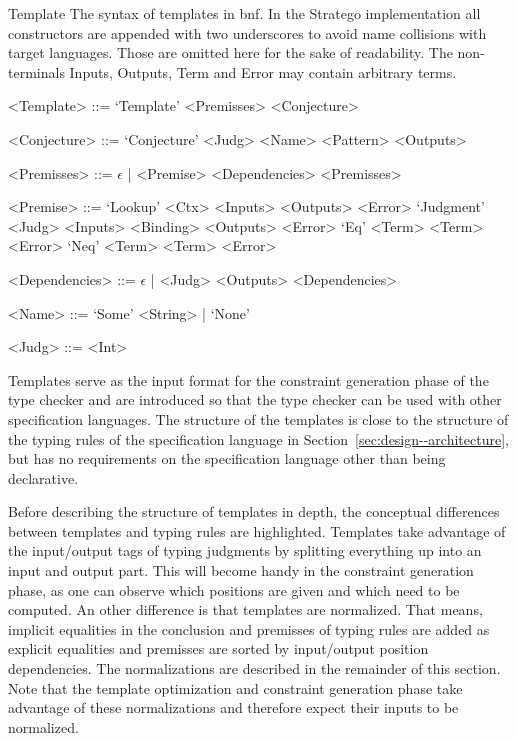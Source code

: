 \begin{definition}{Template}
  The syntax of templates in \gls{bnf}. In the Stratego implementation
  all constructors are appended with two underscores to avoid name
  collisions with target languages. Those are omitted here for the
  sake of readability. The non-terminals Inputs, Outputs, Term and
  Error may contain arbitrary terms.
  \begin{grammar}
    <Template> ::= `Template' <Premisses> <Conjecture>

    <Conjecture> ::= `Conjecture' <Judg> <Name> <Pattern> <Outputs>

    <Premisses> ::= $\epsilon$ | <Premise> <Dependencies> <Premisses>

    <Premise> ::= `Lookup' <Ctx> <Inputs> <Outputs> <Error>
    \alt `Judgment' <Judg> <Inputs> <Binding> <Outputs> <Error>
    \alt `Eq' <Term> <Term> <Error>
    \alt `Neq' <Term> <Term> <Error>

    <Dependencies> ::= $\epsilon$ | <Judg> <Outputs> <Dependencies>

    <Name> ::= `Some' <String> | `None'

    <Judg> ::= <Int>
  \end{grammar}
\end{definition}

Templates serve as the input format for the constraint generation
phase of the type checker and are introduced so that the type checker
can be used with other specification languages. The structure of the
templates is close to the structure of the typing rules of the
specification language in Section~\ref{sec:design--architecture}, but
has no requirements on the specification language other than being
declarative.

Before describing the structure of templates in depth, the conceptual
differences between templates and typing rules are highlighted.
Templates take advantage of the input/output tags of typing judgments
by splitting everything up into an input and output part. This will
become handy in the constraint generation phase, as one can observe
which positions are given and which need to be computed. An other
difference is that templates are normalized. That means, implicit
equalities in the conclusion and premisses of typing rules are
added as explicit equalities and premisses are sorted by input/output
position dependencies. The normalizations are described in the
remainder of this section. Note that the template optimization and
constraint generation phase take advantage of these normalizations and
therefore expect their inputs to be normalized.


